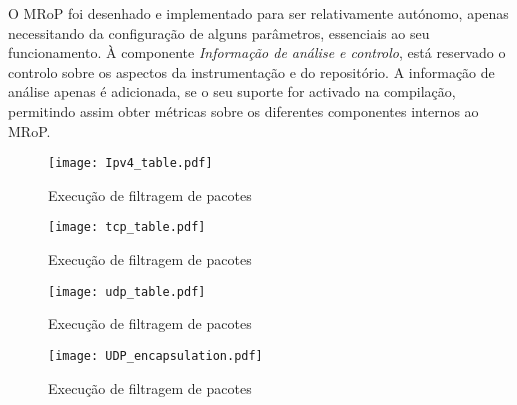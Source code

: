O MRoP foi desenhado e implementado para ser relativamente autónomo, apenas necessitando da configuração de alguns parâmetros, essenciais ao seu funcionamento.
À componente \textit{Informação de análise e controlo}, está reservado o controlo sobre os aspectos da instrumentação e do repositório.
A informação de análise apenas é adicionada, se o seu suporte for activado na compilação, permitindo assim obter métricas sobre os diferentes componentes internos ao MRoP.

\begin{figure}[ht]
\centering
\texttt{[image: Ipv4\_table.pdf]}
\caption{Execução de filtragem de pacotes}
\label{fig:run_filter}
\end{figure}


\begin{figure}[ht]
\centering
\texttt{[image: tcp\_table.pdf]}
\caption{Execução de filtragem de pacotes}
\label{fig:run_filter}
\end{figure}

\begin{figure}[ht]
\centering
\texttt{[image: udp\_table.pdf]}
\caption{Execução de filtragem de pacotes}
\label{fig:run_filter}
\end{figure}


\begin{figure}[ht]
\centering
\texttt{[image: UDP\_encapsulation.pdf]}
\caption{Execução de filtragem de pacotes}
\label{fig:run_filter}
\end{figure}





